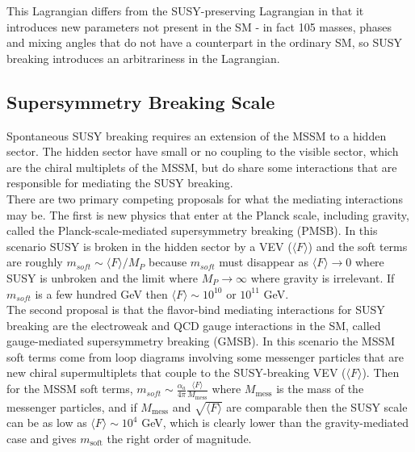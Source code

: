 This Lagrangian differs from the SUSY-preserving Lagrangian in that it introduces new parameters not present in the SM - in fact 105 masses, phases and mixing angles that do not have a counterpart in the ordinary SM, so SUSY breaking introduces an arbitrariness in the Lagrangian.  \\



\subsection{Supersymmetry Breaking Scale}

Spontaneous SUSY breaking requires an extension of the MSSM to a hidden sector.  The hidden sector have small or no coupling to the visible sector, which are the chiral multiplets of the MSSM, but do share some interactions that are responsible for mediating the SUSY breaking.  \\

There are two primary competing proposals for what the mediating interactions may be.  The first is new physics that enter at the Planck scale, including gravity, called the Planck-scale-mediated supersymmetry breaking (PMSB).  In this scenario SUSY is broken in the hidden sector by a VEV ($\langle F \rangle$) and the soft terms are roughly $m_{soft} \sim \langle F \rangle/M_{P}$ because $m_{soft}$ must disappear as $\langle F \rangle \rightarrow 0$ where SUSY is unbroken and the limit where $M_{P} \rightarrow \infty$ where gravity is irrelevant.  If $m_{soft}$ is a few hundred GeV then $\langle F \rangle \sim 10^{10}$ or $10^{11}$ GeV. \\

The second proposal is that the flavor-bind mediating interactions for SUSY breaking are the electroweak and QCD gauge interactions in the SM, called gauge-mediated supersymmetry breaking (GMSB).  In this scenario the MSSM soft terms come from loop diagrams involving some messenger particles that are new chiral supermultiplets that couple to the SUSY-breaking VEV ($\langle F \rangle$).   Then for the MSSM soft terms,  $m_{soft} \sim \frac{\alpha_{a}}{4\pi}\frac{\langle F \rangle}{M_{\mathrm{mess}}}$ where $M_{\mathrm{mess}}$ is the mass of the messenger particles, and if $M_{\mathrm{mess}}$ and $\sqrt{\langle F \rangle}$ are comparable then the SUSY scale can be as low as $\langle F \rangle \sim 10^4$ GeV, which is clearly lower than the gravity-mediated case and gives $m_{\mathrm{soft}}$ the right order of magnitude. \\

